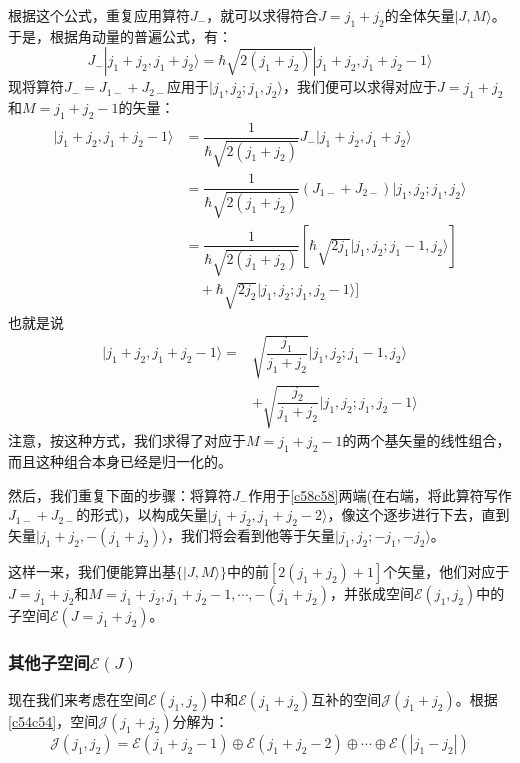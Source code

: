 \documentclass[]{article}
\begin{document}
根据这个公式，重复应用算符$J_-$，就可以求得符合$J=j_1+j_2$的全体矢量$|J,M\rangle$。于是，根据角动量的普遍公式，有：
\begin{equation}
	J_-|j_1+j_2,j_1+j_2\rangle=\hbar\sqrt{2(j_1+j_2)}|j_1+j_2,j_1+j_2-1\rangle
\end{equation}
现将算符$J_-=J_{1-}+J_{2-}$应用于$|j_1,j_2;j_1,j_2\rangle$，我们便可以求得对应于$J=j_1+j_2$和$M=j_1+j_2-1$的矢量：
\begin{align}
	|j_1+j_2,j_1+j_2-1\rangle&=\dfrac{1}{\hbar\sqrt{2(j_1+j_2)}}J_-|j_1+j_2,j_1+j_2\rangle\nonumber\\
	&=\dfrac{1}{\hbar\sqrt{2(j_1+j_2)}}(J_{1-}+J_{2-})|j_1,j_2;j_1,j_2\rangle\nonumber\\
	&=\dfrac{1}{\hbar\sqrt{2(j_1+j_2)}}[\hbar\sqrt{2j_1}|j_1,j_2;j_1-1,j_2\rangle]\nonumber\\
	&\quad+\hbar\sqrt{2j_2}|j_1,j_2;j_1,j_2-1\rangle]
\end{align}
也就是说
\begin{align}
	|j_1+j_2,j_1+j_2-1\rangle=&\sqrt{\dfrac{j_1}{j_1+j_2}}|j_1,j_2;j_1-1,j_2\rangle\nonumber\\
	&+\sqrt{\dfrac{j_2}{j_1+j_2}}|j_1,j_2;j_1,j_2-1\rangle
	\label{c58c58}
\end{align}
注意，按这种方式，我们求得了对应于$M=j_1+j_2-1$的两个基矢量的线性组合，而且这种组合本身已经是归一化的。\par 
然后，我们重复下面的步骤：将算符$J_-$作用于\eqref{c58c58}两端(在右端，将此算符写作$J_{1-}+J_{2-}$的形式)，以构成矢量$|j_1+j_2,j_1+j_2-2\rangle$，像这个逐步进行下去，直到矢量$|j_1+j_2,-(j_1+j_2)\rangle$，我们将会看到他等于矢量$|j_1,j_2;-j_1,-j_2\rangle$。\par 
这样一来，我们便能算出基$\{|J,M\rangle\}$中的前$[2(j_1+j_2)+1]$个矢量，他们对应于$J=j_1+j_2$和$M=j_1+j_2,j_1+j_2-1,\cdots,-(j_1+j_2)$，并张成空间$\mathscr{E}(j_1,j_2)$中的子空间$\mathscr{E}(J=j_1+j_2)$。
\subsubsection{其他子空间$\mathscr{E}(J)$}
现在我们来考虑在空间$\mathscr{E}(j_1,j_2)$中和$\mathscr{E}(j_1+j_2)$互补的空间$\mathscr{J}(j_1+j_2)$。根据\eqref{c54c54}，空间$\mathscr{J}(j_1+j_2)$分解为：
\begin{equation}
	\mathscr{J}(j_1,j_2)=\mathscr{E}(j_1+j_2-1)\oplus\mathscr{E}(j_1+j_2-2)\oplus\cdots\oplus\mathscr{E}(|j_1-j_2|)
\end{equation}
\end{document}
